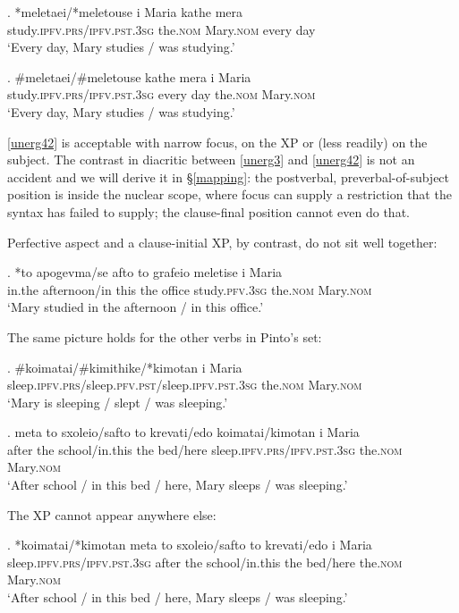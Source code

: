 \documentclass[11pt]{article}
\newcommand{\pfv}{\textsc{pfv}\xspace}
\newcommand{\ipfv}{\textsc{ipfv}\xspace}
\begin{document}
\exg. *meletaei/*meletouse i Maria kathe mera\\
study.\ipfv.\textsc{prs}/\ipfv.\textsc{pst}.3\textsc{sg} the.\textsc{nom} Mary.\textsc{nom} every day\\ \label{unerg3}
`Every day, Mary studies / was studying.'

\exg. \#meletaei/\#meletouse kathe mera i Maria\\
study.\ipfv.\textsc{prs}/\ipfv.\textsc{pst}.3\textsc{sg} every day the.\textsc{nom} Mary.\textsc{nom}\\ \label{unerg42}
`Every day, Mary studies / was studying.'

\ref{unerg42} is acceptable with narrow focus, on the XP or (less readily) on the subject.  The contrast in diacritic between \ref{unerg3} and \ref{unerg42} is not an accident and we will derive it in \S\ref{mapping}: the postverbal, preverbal-of-subject position is inside the nuclear scope, where focus can supply a restriction that the syntax has failed to supply; the clause-final position cannot even do that.

Perfective aspect and a clause-initial XP, by contrast, do not sit well together:

\exg. *to apogevma/se afto to grafeio meletise i Maria\\
in.the afternoon/in this the office study.\pfv.3\textsc{sg} the.\textsc{nom} Mary.\textsc{nom}\\ \label{unerg2}
`Mary studied in the afternoon / in this office.'

The same picture holds for the other verbs in Pinto's set:

\exg. \#koimatai/\#kimithike/*kimotan i Maria\\
sleep.\ipfv.\textsc{prs}/sleep.\pfv.\textsc{pst}/sleep.\ipfv.\textsc{pst}.3\textsc{sg} the.\textsc{nom} Mary.\textsc{nom}\\ \label{unergative4}
`Mary is sleeping / slept / was sleeping.'

\exg. meta to sxoleio/safto to krevati/edo koimatai/kimotan i Maria\\
after the school/in.this the bed/here sleep.\ipfv.\textsc{prs}/\ipfv.\textsc{pst}.3\textsc{sg} the.\textsc{nom} Mary.\textsc{nom}\\ \label{unergative3}
`After school / in this bed / here, Mary sleeps / was sleeping.'

The XP cannot appear anywhere else:

\exg. *koimatai/*kimotan meta to sxoleio/safto to krevati/edo i Maria\\
sleep.\ipfv.\textsc{prs}/\ipfv.\textsc{pst}.3\textsc{sg} after the school/in.this the bed/here the.\textsc{nom} Mary.\textsc{nom}\\ \label{unergative35}
`After school / in this bed / here, Mary sleeps / was sleeping.'
\end{document}
